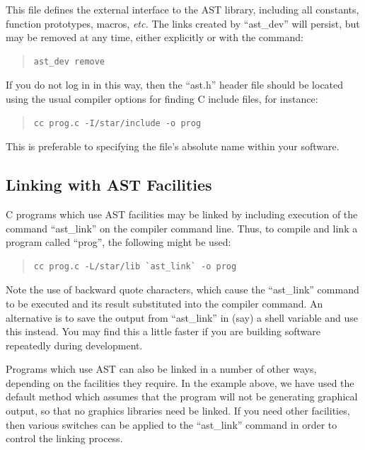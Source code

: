 \documentclass[twoside,11pt]{article}
\newcommand{\htmlref}[2]{#1}
\begin{document}
This file defines the external interface to the AST library, including
all constants, function prototypes, macros, {\em{etc.}}
The links created by ``\htmlref{ast\_dev}{ast_dev}'' will persist, but may be removed at
any time, either explicitly or with the command:

\begin{quote}
\small
\begin{verbatim}
ast_dev remove
\end{verbatim}
\normalsize
\end{quote}

If you do not log in in this way, then the ``ast.h'' header file
should be located using the usual compiler options for finding C
include files, for instance:

\begin{quote}
\small
\begin{verbatim}
cc prog.c -I/star/include -o prog
\end{verbatim}
\normalsize
\end{quote}

This is preferable to specifying the file's absolute name within your
software.

\subsection{\label{ss:linking}Linking with AST Facilities}

C programs which use AST facilities may be linked by including
execution of the command ``\htmlref{ast\_link}{ast_link}'' on the compiler command
line. Thus, to compile and link a program called ``prog'', the
following might be used:

\begin{quote}
\small
\begin{verbatim}
cc prog.c -L/star/lib `ast_link` -o prog
\end{verbatim}
\normalsize
\end{quote}

Note the use of backward quote characters, which cause the
``ast\_link'' command to be executed and its result substituted into
the compiler command. An alternative is to save the output from
``ast\_link'' in (say) a shell variable and use this instead. You may
find this a little faster if you are building software repeatedly
during development.

Programs which use AST can also be linked in a number of other ways,
depending on the facilities they require. In the example above, we
have used the default method which assumes that the program will not
be generating graphical output, so that no graphics libraries need be
linked. If you need other facilities, then various switches can be
applied to the ``ast\_link'' command in order to control the linking
process.
\end{document}
